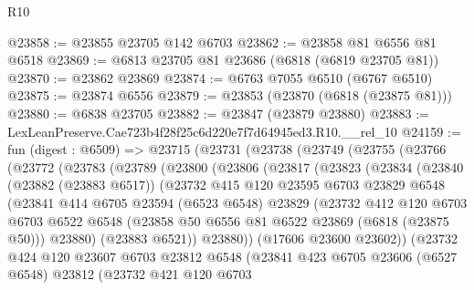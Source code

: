 \begin{lexlean}{R10}
\begin{coremodule}
@23858 := @23855 @23705 @142 @6703
@23862 := @23858 @81 @6556 @81 @6518
@23869 := @6813 @23705 @81 @23686 (@6818 (@6819 @23705 @81))
@23870 := @23862 @23869
@23874 := @6763 @7055 @6510 (@6767 @6510)
@23875 := @23874 @6556
@23879 := @23853 (@23870 (@6818 (@23875 @81)))
@23880 := @6838 @23705
@23882 := @23847 (@23879 @23880)
@23883 := LexLeanPreserve.Cae723b4f28f25c6d220e7f7d64945ed3.R10.__rel_10
@24159 := fun (digest : @6509) =>
  @23715
    (@23731
      (@23738
        (@23749
          (@23755
            (@23766
              (@23772
                (@23783
                  (@23789
                    (@23800
                      (@23806
                        (@23817
                          (@23823
                            (@23834
                              (@23840
                                (@23882 (@23883 @6517))
                                (@23732
                                  @415
                                  @120
                                  @23595
                                  @6703
                                  @23829
                                  @6548
                                  (@23841
                                    @414
                                    @6705
                                    @23594
                                    (@6523 @6548)
                                    @23829
                                    (@23732
                                      @412
                                      @120
                                      @6703
                                      @6703
                                      @6522
                                      @6548
                                      (@23858 @50 @6556 @81 @6522 @23869 (@6818 (@23875 @50)))
                                      @23880)
                                    (@23883 @6521))
                                  @23880))
                              (@17606 @23600 @23602))
                            (@23732
                              @424
                              @120
                              @23607
                              @6703
                              @23812
                              @6548
                              (@23841
                                @423
                                @6705
                                @23606
                                (@6527 @6548)
                                @23812
                                (@23732
                                  @421
                                  @120
                                  @6703

\end{coremodule}
\end{lexlean}
